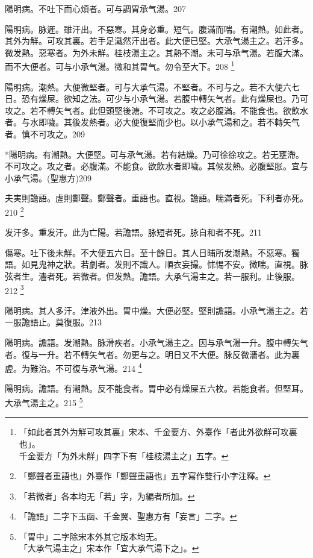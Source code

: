 \documentclass[12pt,twoside,UTF8,b5paper]{ctexbook}
\begin{document}
陽明病。不吐下而{心}煩者。可与{調胃}承气湯。207

陽明病。脉遲。雖汗出。不惡寒。其身必重。短气。腹滿而喘。有潮熱。如此者。其外为觧。可攻其裏。若手足濈然汗出者。此大便已堅。{大}承气湯主之。若汗多。微发熱。惡寒者。为外未觧。{桂枝湯主之。}其熱不潮。未可与承气湯。若腹大滿。而不大便者。可与小承气湯。微和其胃气。勿令至大下。208
	\footnote{「如此者其外为觧可攻其裏」宋本、千金要方、外臺作「者此外欲觧可攻裏也」。\\千金要方「为外未觧」四字下有「桂枝湯主之」五字。}

陽明病。潮熱。大便微堅者。可与{大}承气湯。不堅者。不可与之。若不大便六七日。恐有燥屎。欲知之法。可少与小承气湯。若腹中轉矢气者。此有燥屎也。乃可攻之。若不轉矢气者。此但頭堅後溏。不可攻之。攻之必腹滿。不能食也。欲飲水者。与水即噦。其後发熱者。必大便復堅而少也。以小承气湯和之。若不轉矢气者。慎不可攻之。209

*陽明病。有潮熱。大便堅。可与承气湯。若有結燥。乃可徐徐攻之。若无壅滯。不可攻之。攻之者。必腹滿。不能食。欲飲水者即噦。其候发熱。必腹堅胀。宜与小承气湯。(聖惠方)209

夫実則譫語。虗則鄭聲。鄭聲者。重語也。直視。譫語。喘滿者死。下利者亦死。210
	\footnote{「鄭聲者重語也」外臺作「鄭聲重語也」五字寫作雙行小字注釋。}

发汗多。重发汗。{此为}亡陽。{若}譫語。脉短者死。脉自和者不死。211

傷寒。吐下後未觧。不大便五六日。至十餘日。其人日晡所发潮熱。不惡寒。獨語。如見鬼{神之}狀。若劇者。发則不識人。順衣妄撮。怵惕不安。微喘。直視。脉弦者生。濇者死。{若}微者。但发熱。譫語。{大}承气湯主之。若一服利。止後服。212
	\footnote{「若微者」各本均无「若」字，为編者所加。}

陽明病。其人多汗。津液外出。胃中燥。大便必堅。堅則譫語。{小}承气湯主之。{若一服譫語止。莫復服。}213

陽明病。譫語。发潮熱。脉滑疾者。{小}承气湯主之。因与承气湯一升。腹中轉矢气者。復与一升。若不轉矢气者。勿更与之。明日又不大便。脉反微濇者。此为裏虗。为難治。不可復与承气湯。214
	\footnote{「譫語」二字下玉函、千金翼、聖惠方有「妄言」二字。}

陽明病。譫語。有潮熱。反不能食者。{胃中}必有燥屎五六枚。若能食者。但堅耳。{大}承气湯主之。215
	\footnote{「胃中」二字除宋本外其它版本均无。\\「大承气湯主之」宋本作「宜大承气湯下之」。}
\end{document}

